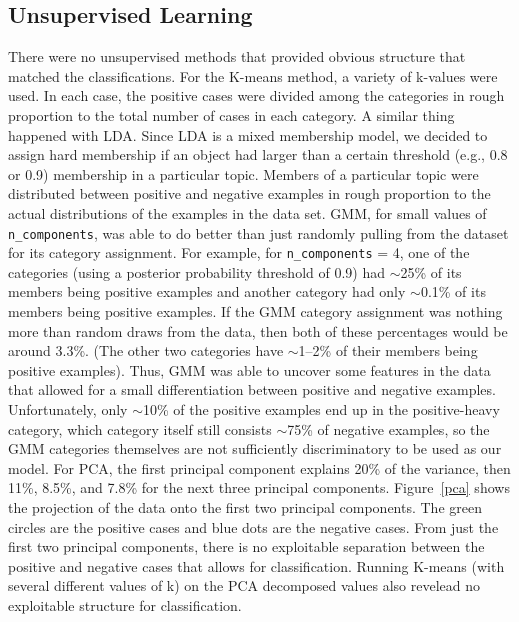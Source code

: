 \subsection{Unsupervised Learning}
There were no unsupervised methods that provided obvious structure  that matched the classifications.  For the K-means method, a variety of k-values were used.  In each case, the positive cases were divided among the categories in rough proportion to the total number of cases in each category.  A similar thing happened with LDA.  Since LDA is a mixed membership model, we decided to assign hard membership if an object had larger than a certain threshold (e.g., 0.8 or 0.9) membership in a particular topic.  Members of a particular topic were distributed between positive and negative examples in rough proportion to the actual distributions of the examples in the data set.  GMM, for small values of \texttt{n\_components}, was able to do better than just randomly pulling from the dataset for its category assignment.  For example, for \texttt{n\_components} = 4, one of the categories (using a posterior probability threshold of 0.9) had ${\sim}$25\% of its members being positive examples and another category had only ${\sim}$0.1\% of its members being positive examples.  If the GMM category assignment was nothing more than random draws from the data, then both of these percentages would be around 3.3\%.  (The other two categories have ${\sim}$1--2\% of their members being positive examples).  Thus, GMM was able to uncover some features in the data that allowed for a small differentiation between positive and negative examples.  Unfortunately, only ${\sim}$10\% of the positive examples end up in the positive-heavy category, which category itself still consists ${\sim}$75\% of negative examples, so the GMM categories themselves are not sufficiently discriminatory to be used as our model.
For PCA, the first principal component explains 20\% of the variance, then 11\%, 8.5\%, and 7.8\% for the next three principal components.  Figure~\ref{pca} shows the projection of the data onto the first two principal components.  The green circles are the positive cases and blue dots are the negative cases.  From just the first two principal components, there is no exploitable separation between the positive and negative cases that allows for classification.  Running K-means (with several different values of k) on the PCA decomposed values also revelead no exploitable structure for classification.
